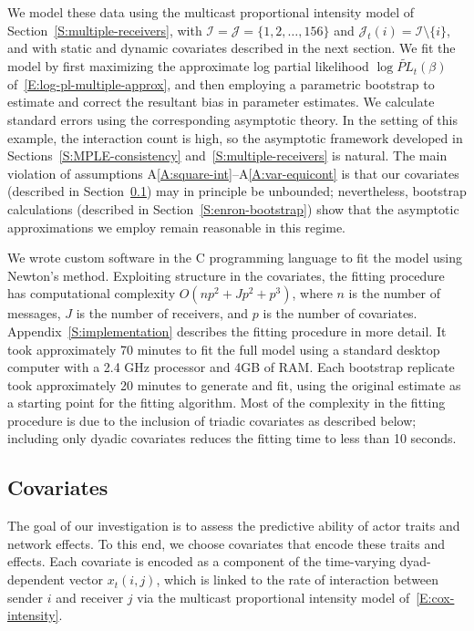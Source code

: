 \documentclass[final]{statsoc}
\begin{document}
We model these data using the multicast proportional intensity
model of Section~\ref{S:multiple-receivers}, with
$\mathcal{I} = \mathcal{J} = \{ 1, 2, \ldots, 156 \}$ and
$\mathcal{J}_t(i) = \mathcal{I} \setminus \{ i \}$, and with static and
dynamic covariates described in the next section.
We fit the model by first maximizing the approximate log partial
likelihood $\log \widetilde{\mathit{PL}}_t(\beta)$ of~\eqref{E:log-pl-multiple-approx}, and then employing a
parametric bootstrap to estimate and correct the resultant bias in
parameter estimates.  We calculate standard errors using the
corresponding asymptotic theory.
In the setting of this example, the interaction count is high, so
the asymptotic framework developed in Sections~\ref{S:MPLE-consistency}
and~\ref{S:multiple-receivers} is natural.  The main violation of assumptions
A\ref{A:square-int}--A\ref{A:var-equicont} is that our covariates (described in Section~\ref{S:enron-covariates}) may
in principle be unbounded; nevertheless, bootstrap calculations
(described in Section~\ref{S:enron-bootstrap}) show that the asymptotic approximations we employ remain reasonable in this regime.

We wrote custom software in the C programming language to fit the model using
Newton's method.  Exploiting structure in the covariates, the fitting
procedure has computational complexity $O(n p^2 + J p^2 + p^3)$, where $n$ is
the number of messages, $J$ is the number of receivers, and $p$ is the number
of covariates.  Appendix~\ref{S:implementation} describes the fitting
procedure in more detail.  It took approximately 70 minutes to fit the full
model using a standard desktop computer with a 2.4 GHz processor and 4GB of RAM.  Each bootstrap replicate took
approximately 20 minutes to generate and fit, using the original estimate as a
starting point for the fitting algorithm.  Most of the complexity in the
fitting procedure is due to the inclusion of triadic covariates as described below; including only dyadic covariates reduces the fitting time to less than 10 seconds.

\subsection{Covariates}\label{S:enron-covariates}

The goal of our investigation is to assess the predictive ability of actor traits and network effects.  To this end, we choose covariates that encode these traits and effects.  Each covariate is encoded as a component of the time-varying dyad-dependent vector $x_t(i,j)$, which is linked to the rate of interaction between sender $i$ and receiver $j$ via the multicast proportional intensity model of~\eqref{E:cox-intensity}.
\end{document}
